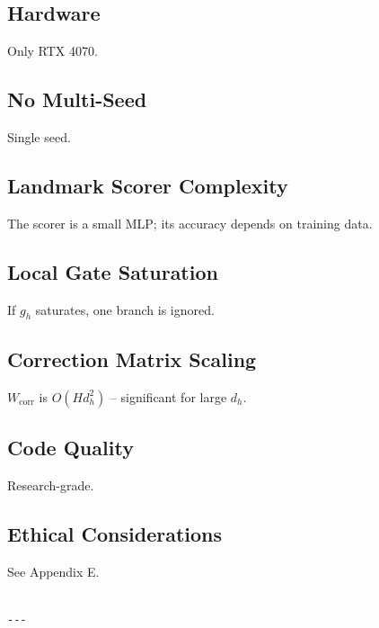 \subsection{Hardware}

Only RTX 4070.

\subsection{No Multi-Seed}

Single seed.

\subsection{Landmark Scorer Complexity}

The scorer is a small MLP; its accuracy depends on training data.

\subsection{Local Gate Saturation}

If $g_h$ saturates, one branch is ignored.

\subsection{Correction Matrix Scaling}

$W_\text{corr}$ is $O(H d_h^2)$ -- significant for large $d_h$.

\subsection{Code Quality}

Research-grade.

\subsection{Ethical Considerations}

See Appendix E.
\begin{lstlisting}

---
\end{lstlisting}